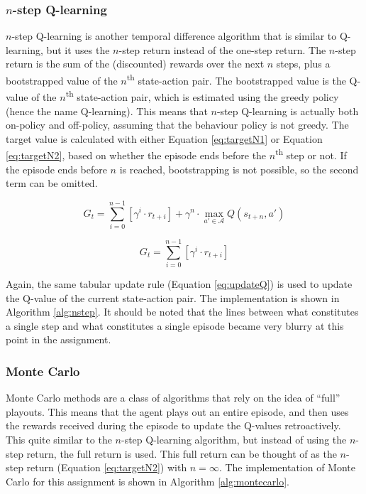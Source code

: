 \documentclass{article}
\begin{document}
\subsubsection*{$n$-step Q-learning}
\label{sssec:nstep}

$n$-step Q-learning is another temporal difference algorithm that is similar to Q-learning, but it uses the $n$-step return instead of the one-step return.
The $n$-step return is the sum of the (discounted) rewards over the next $n$ steps, plus a bootstrapped value of the $n$\textsuperscript{th} state-action pair.
The bootstrapped value is the Q-value of the $n$\textsuperscript{th} state-action pair, which is estimated using the greedy policy (hence the name Q-learning).
This means that $n$-step Q-learning is actually both on-policy and off-policy, assuming that the behaviour policy is not greedy.
The target value is calculated with either Equation \ref{eq:targetN1} or Equation \ref{eq:targetN2}, based on whether the episode ends before the $n$\textsuperscript{th} step or not.
If the episode ends before $n$ is reached, bootstrapping is not possible, so the second term can be omitted.

\begin{equation}
    G_t = \sum_{i=0}^{n-1} \left[ \gamma^i \cdot r_{t+i} \right] + \gamma^n \cdot \max_{a' \in \mathcal{A}} Q(s_{t+n}, a')
    \label{eq:targetN1}
\end{equation}

\begin{equation}
    G_t = \sum_{i=0}^{n-1} \left[ \gamma^i \cdot r_{t+i} \right]
    \label{eq:targetN2}
\end{equation}

Again, the same tabular update rule (Equation \ref{eq:updateQ}) is used to update the Q-value of the current state-action pair.
The implementation is shown in Algorithm \ref{alg:nstep}.
It should be noted that the lines between what constitutes a single step and what constitutes a single episode became very blurry at this point in the assignment.

\subsubsection*{Monte Carlo}
\label{sssec:montecarlo}

Monte Carlo methods are a class of algorithms that rely on the idea of ``full'' playouts.
This means that the agent plays out an entire episode, and then uses the rewards received during the episode to update the Q-values retroactively.
This quite similar to the $n$-step Q-learning algorithm, but instead of using the $n$-step return, the full return is used.
This full return can be thought of as the $n$-step return (Equation \ref{eq:targetN2}) with $n = \infty$.
The implementation of Monte Carlo for this assignment is shown in Algorithm \ref{alg:montecarlo}.
\end{document}
